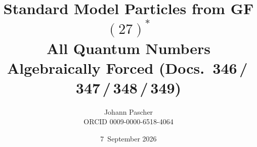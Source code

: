 \documentclass[11pt,a4paper,landscape]{report}
\title{Standard Model Particles from GF$(27)^*$\\[0.5em]
  \large All Quantum Numbers Algebraically Forced
  (Docs.~346\,/\,347\,/\,348\,/\,349)}
\date{7~September 2026}
\author{Johann Pascher\\\small ORCID 0009-0000-6518-4064}
\begin{document}
\renewcommand{\thechapter}{}
\renewcommand{\thesection}{\arabic{section}}
\maketitle
\tableofcontents

\end{document}
